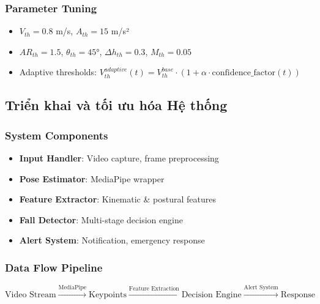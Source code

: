 \subsubsection{Parameter Tuning}
\begin{itemize}
    \item $V_{th} = 0.8$ m/s, $A_{th} = 15$ m/s²
    \item $AR_{th} = 1.5$, $\theta_{th} = 45°$, $\Delta h_{th} = 0.3$, $M_{th} = 0.05$
    \item Adaptive thresholds: $V_{th}^{adaptive}(t) = V_{th}^{base} \cdot (1 + \alpha \cdot \text{confidence\_factor}(t))$
\end{itemize}

\subsection{Triển khai và tối ưu hóa Hệ thống}

\subsubsection{System Components}
\begin{itemize}
    \item \textbf{Input Handler}: Video capture, frame preprocessing
    \item \textbf{Pose Estimator}: MediaPipe wrapper
    \item \textbf{Feature Extractor}: Kinematic \& postural features
    \item \textbf{Fall Detector}: Multi-stage decision engine
    \item \textbf{Alert System}: Notification, emergency response
\end{itemize}

\subsubsection{Data Flow Pipeline}
\begin{equation}
\text{Video Stream} \xrightarrow{\text{MediaPipe}} \text{Keypoints} 
\xrightarrow{\text{Feature Extraction}} \text{Decision Engine} 
\xrightarrow{\text{Alert System}} \text{Response}
\end{equation}
